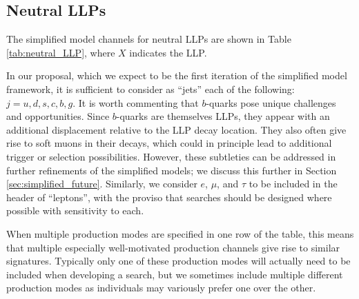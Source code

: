 \subsection{Neutral LLPs}

The simplified model channels for neutral LLPs are shown in Table
\ref{tab:neutral_LLP}, where $X$ indicates the
LLP.

 
 In our proposal, which we expect to be the first iteration of the simplified
model framework, it is sufficient to consider as ``jets'' each of the
following:~$j=u,d,s,c,b,g$. It is worth commenting that $b$-quarks pose
unique challenges and opportunities. Since $b$-quarks are themselves
LLPs, they appear with an additional displacement relative to the LLP
decay location. They also often give rise to soft muons in their
decays, which could in principle lead to additional trigger or
selection possibilities.  However, these subtleties can be addressed
in further refinements of the simplified models; we discuss this further in Section
\ref{sec:simplified_future}. Similarly, we consider $e$,
$\mu$, and $\tau$ to be included in the header of ``leptons'', with the proviso that
searches should be designed where possible with sensitivity to each.
 
When multiple production modes are specified in one row of the table, this means that multiple
 especially well-motivated production channels give rise to similar
signatures. Typically only one of these production modes will actually need to
be included when developing a search, but we sometimes include multiple different production modes
as individuals may variously prefer one over the other. 


